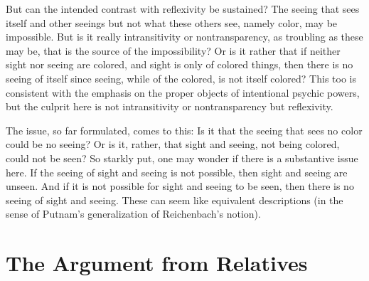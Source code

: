 But can the intended contrast with reflexivity be sustained? The seeing that sees itself and other seeings but not what these others see, namely color, may be impossible. But is it really intransitivity or nontransparency, as troubling as these may be, that is the source of the impossibility? Or is it rather that if neither sight nor seeing are colored, and sight is only of colored things, then there is no seeing of itself since seeing, while of the colored, is not itself colored? This too is consistent with the emphasis on the proper objects of intentional psychic powers, but the culprit here is not intransitivity or nontransparency but reflexivity.

The issue, so far formulated, comes to this: Is it that the seeing that sees no color could be no seeing? Or is it, rather, that sight and seeing, not being colored, could not be seen? So starkly put, one may wonder if there is a substantive issue here. If the seeing of sight and seeing is not possible, then sight and seeing are unseen. And if it is not possible for sight and seeing to be seen, then there is no seeing of sight and seeing. These can seem like equivalent descriptions (in the sense of Putnam's \citeyear{Putnam:1967mf} generalization of Reichenbach's \citeyear{reichenbach38} notion).








\section{The Argument from Relatives} %
\label{sec:the_argument_from_relatives}


